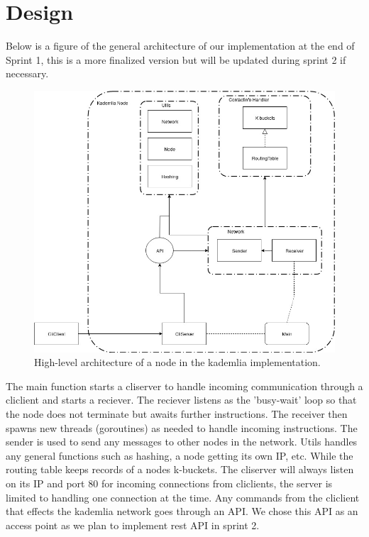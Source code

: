 \section{Design}\label{sec:design}

Below is a figure of the general architecture of our implementation at the end of Sprint 1, this is a more finalized version but will be updated during sprint 2 if necessary.
\begin{figure}[ht]
\centering
\includegraphics[width=\linewidth]{D7024E-architecture.jpg}
\caption{High-level architecture of a node in the kademlia implementation.}
\end{figure}

The main function starts a cliserver to handle incoming communication through a cliclient and starts a reciever. The reciever listens as the 'busy-wait' loop so that the node does not terminate but awaits further instructions. The receiver then spawns new threads (goroutines) as needed to handle incoming instructions. The sender is used to send any messages to other nodes in the network. Utils handles any general functions such as hashing, a node getting its own IP, etc. While the routing table keeps records of a nodes k-buckets.
The cliserver will always listen on its IP and port 80 for incoming connections from cliclients, the server is limited to handling one connection at the time. Any commands from the cliclient that effects the kademlia network goes through an API. We chose this API as an access point as we plan to implement rest API in sprint 2.

